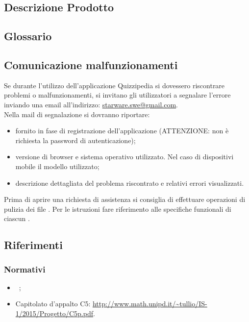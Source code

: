 \documentclass[12pt,a4paper]{article}
\begin{document}
	\subsection{Descrizione Prodotto}
	\descrizioneProdotto
	
	\subsection{Glossario}
	\glossarioPrint
	\subsection{Comunicazione malfunzionamenti}
	Se durante l’utilizzo dell’applicazione Quizzipedia si dovessero riscontrare problemi o 	malfunzionamenti, si invitano gli utilizzatori a segnalare l’errore inviando una email all’indirizzo:
	\url{starware.swe@gmail.com}. \\
	Nella mail di segnalazione si dovranno riportare:
	\begin{itemize}
		\item {} fornito in fase di registrazione dell’applicazione (ATTENZIONE: non è richiesta la password di autenticazione);
		\item versione di browser e sistema operativo utilizzato. Nel caso di dispositivi mobile il modello utilizzato;
		\item descrizione dettagliata del problema riscontrato e relativi errori visualizzati.
	\end{itemize}
	Prima di aprire una richiesta di assistenza si consiglia di effettuare operazioni di pulizia dei file . Per le istruzioni fare riferimento alle specifiche funzionali di ciascun .
	
	\subsection{Riferimenti}
	
\subsubsection{Normativi}
\begin{itemize}
	\item \NdPv\ ;
	\item Capitolato d'appalto C5: \url{http://www.math.unipd.it/~tullio/IS-1/2015/Progetto/C5p.pdf}.
\end{itemize}
\end{document}
